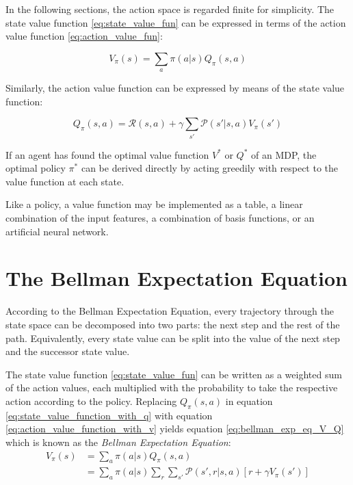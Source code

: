 In the following sections, the action space is regarded finite for simplicity.
The state value function \ref{eq:state_value_fun} can be expressed in terms of the action value function \ref{eq:action_value_fun}:

\begin{equation}
V_\pi(s) = \sum_{a}\pi(a|s)Q_\pi(s,a)
\label{eq:state_value_function_with_q}
\end{equation}

Similarly, the action value function can be expressed by means of the state value function:

\begin{equation}
Q_\pi(s,a)=\mathcal{R}(s,a)+\gamma \sum_{s'}\mathcal{P}(s'|s,a)V_\pi(s')
\label{eq:action_value_function_with_v}
\end{equation}

If an agent has found the optimal value function $V^*$ or $Q^*$ of an MDP, the optimal policy $\pi^*$ can be derived directly by acting greedily with respect to the value function at each state.

Like a policy, a value function may be implemented as a table, a linear combination of the input features, a combination of basis functions, or an artificial neural network.

\section{The Bellman Expectation Equation}

According to the Bellman Expectation Equation, every trajectory through the state space can be decomposed into two parts: the next step and the rest of the path. Equivalently, every state value can be split into the value of the next step and the successor state value.

The state value function \ref{eq:state_value_fun} can be written as a weighted sum of the action values, each multiplied with the probability to take the respective action according to the policy. Replacing $Q_\pi(s,a)$ in equation \ref{eq:state_value_function_with_q} with equation \ref{eq:action_value_function_with_v} yields equation \ref{eq:bellman_exp_eq_V_Q} which is known as the \textit{Bellman Expectation Equation}:
\begin{align}
V_\pi(s)&=\sum_a \pi(a|s)Q_\pi(s,a)\\ &= \sum_a \pi(a|s)\sum_r \sum_{s'} \mathcal{P}(s',r|s,a)[r+\gamma V_{\pi}(s')]
\label{eq:bellman_exp_eq_V_Q}
\end{align}

